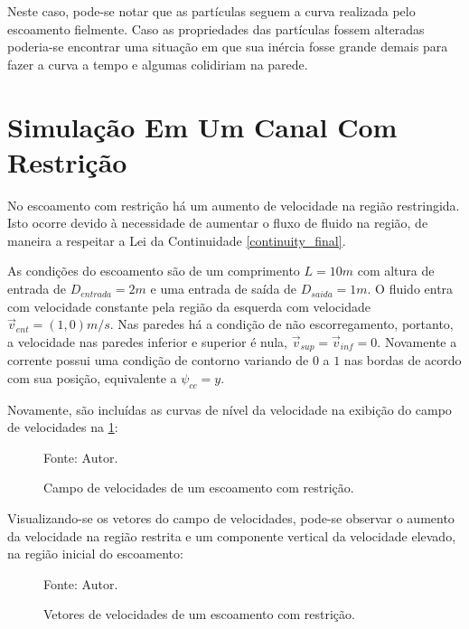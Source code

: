 Neste caso, pode-se notar que as partículas seguem a curva realizada pelo escoamento fielmente.
Caso as propriedades das partículas fossem alteradas poderia-se encontrar uma situação em que sua inércia fosse grande demais para fazer a curva a tempo e algumas colidiriam na parede. 

\section{\textbf{Simulação Em Um Canal Com Restrição}}
\label{sec_nozzle}
No escoamento com restrição há um aumento de velocidade na região restringida.
Isto ocorre devido à necessidade de aumentar o fluxo de fluido na região, de maneira a respeitar a Lei da Continuidade \eqref{continuity_final}.

As condições do escoamento são de um comprimento $L=10m$ com altura de entrada de $D_{entrada}=2m$ e uma entrada de saída de $D_{saida}=1m$.
O fluido entra com velocidade constante pela região da esquerda com velocidade $\vec{v}_{ent}=(1, 0)m/s$.
Nas paredes há a condição de não escorregamento, portanto, a velocidade nas paredes inferior e superior é nula, $\vec{v}_{sup}=\vec{v}_{inf}=0$.
Novamente a corrente possui uma condição de contorno variando de $0$ a $1$ nas bordas de acordo com sua posição, equivalente a $\psi_{cc}=y$.

Novamente, são incluídas as curvas de nível da velocidade na exibição do campo de velocidades na \ref{nozzle_result}:
\begin{figure}[H]
    \centering
     {\raggedleft \scriptsize Fonte: Autor.}
    \caption{Campo de velocidades de um escoamento com restrição.}
    \label{nozzle_result}
\end{figure}

Visualizando-se os vetores do campo de velocidades, pode-se observar o aumento da velocidade na região restrita e um componente vertical da velocidade elevado, na região inicial do escoamento:
\begin{figure}[H]
    \centering
     {\raggedleft \scriptsize Fonte: Autor.}
    \caption{Vetores de velocidades de um escoamento com restrição.}
    \label{nozzle_velocity}
\end{figure}

